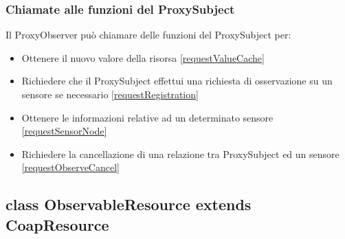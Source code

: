 			\subsubsection{Chiamate alle funzioni del ProxySubject}
				Il ProxyObserver può chiamare delle funzioni del ProxySubject per:
				\begin{itemize}
					\item Ottenere il nuovo valore della risorsa \ref{requestValueCache}
					\item Richiedere che il ProxySubject effettui una richiesta di osservazione su un sensore se necessario \ref{requestRegistration}
					\item Ottenere le informazioni relative ad un determinato sensore \ref{requestSensorNode}
					\item Richiedere la cancellazione di una relazione tra ProxySubject ed un sensore \ref{requestObserveCancel}
				\end{itemize}

				
				
				
				
		\subsection { class ObservableResource extends CoapResource}
